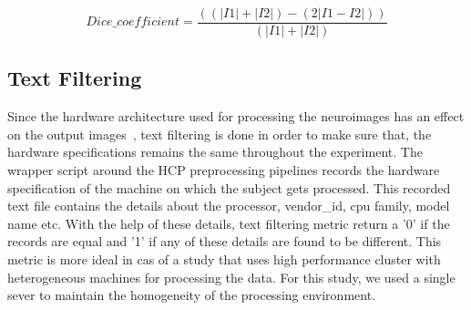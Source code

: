\begin{equation}
  \label{eq:eq_two}
    Dice\_coefficient = \frac{((|I1| + |I2|) - (2|I1 - I2|))}{(|I1| + |I2|)}
\end{equation}

\iffalse
\DontPrintSemicolon
\SetKwFunction{FMain}{Convert\_image}
\SetKwProg{Fn}{Function}{:}{}
\Fn{\FMain{$image$}}{
  \begin{algorithmic}[1]
    \IF{image extension is ``.mgz":}
      \STATE convert image to ``.nii"
    \ELSE
      \STATE do nothing
    \ENDIF
  \end{algorithmic}
\KwRet image\;
}
\hfill \break
\hfill \break
\SetKwFunction{FDice}{Get\_NRMSE}
\SetKwProg{Pn}{Function}{:}{}
\Pn{\FDice{$image\-1$,$image\-2$}}{
  \begin{algorithmic}[1]
    \STATE image\_1 $\leftarrow$ Convert\_image(image\-1);
    \STATE image\_2 $\leftarrow$ Convert\_image(image\-2);
    \STATE \textbf{fslmaths} image\_1 \text{-sub} image\_2 $\rightarrow$ diff;
    \STATE nonzero\_voxels\_image1 $\leftarrow$ get the $\textless$non-zero voxels$\textgreater$ $\textless$volume$\textgreater$ from image\_1; \COMMENT{using FSL}
    \STATE nonzero\_voxels\_image2 $\leftarrow$ get the $\textless$non-zero voxels$\textgreater$ $\textless$volume$\textgreater$ from image\_2;
    \STATE nonzero\_voxels\_difference $\leftarrow$ get the $\textless$non-zero voxels$\textgreater$ $\textless$volume$\textgreater$ from difference of images;
    \STATE \textbf{Dice\_coeff} $\leftarrow$ $\frac{(nonzero\_voxels\_image1+nonzero\_voxels\_image2)-nonzero\_voxels\_difference}{(nonzero\_voxels\_image1+nonzero\_voxels\_image2)}$;
  \end{algorithmic}
\KwRet \textbf{Dice\_coeff}\;
}
\caption*{Algorithm 2: Algorithm for finding Dice coefficient similarity from images}
\label{alg:dice_algorithm}
\fi

\subsection{Text Filtering}
Since the hardware architecture used for processing the neuroimages has an effect on the output images~\cite{10.1371/journal.pone.0038234}, text filtering is done in order to make sure that, the hardware specifications remains the same throughout the experiment. The wrapper script around the HCP preprocessing pipelines records the hardware specification of the machine on which the subject gets processed. This recorded text file contains the details about the processor, vendor\_id, cpu family, model name etc. With the help of these details, text filtering metric return a '0' if the records are equal and '1' if any of these details are found to be different. This metric is more ideal in cas of a study that uses high performance cluster with heterogeneous machines for processing the data. For this study, we used a single sever to maintain the homogeneity of the processing environment.

